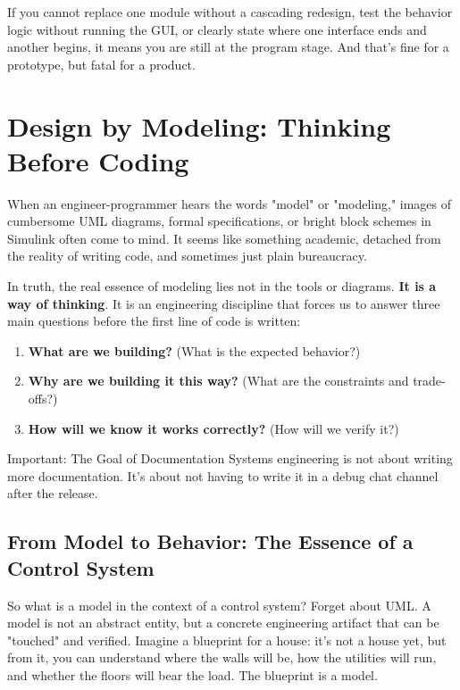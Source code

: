 If you cannot replace one module without a cascading redesign, test the behavior logic without running the GUI, or clearly state where one interface ends and another begins, it means you are still at the program stage. And that's fine for a prototype, but fatal for a product.


\section{Design by Modeling: Thinking Before Coding}

When an engineer-programmer hears the words "model" or "modeling," images of cumbersome UML diagrams, formal specifications, or bright block schemes in Simulink often come to mind. It seems like something academic, detached from the reality of writing code, and sometimes just plain bureaucracy.

In truth, the real essence of modeling lies not in the tools or diagrams. \textbf{It is a way of thinking}. It is an engineering discipline that forces us to answer three main questions before the first line of code is written:
\begin{enumerate}
    \item \textbf{What are we building?} (What is the expected behavior?)
    \item \textbf{Why are we building it this way?} (What are the constraints and trade-offs?)
    \item \textbf{How will we know it works correctly?} (How will we verify it?)
\end{enumerate}

\begin{principlebox}{Important: The Goal of Documentation}
Systems engineering is not about writing more documentation. It's about not having to write it in a debug chat channel after the release.
\end{principlebox}

\subsection{From Model to Behavior: The Essence of a Control System}

So what is a model in the context of a control system? Forget about UML. A model is not an abstract entity, but a concrete engineering artifact that can be "touched" and verified. Imagine a blueprint for a house: it's not a house yet, but from it, you can understand where the walls will be, how the utilities will run, and whether the floors will bear the load. The blueprint is a model.

